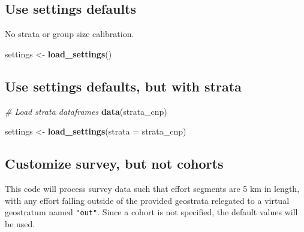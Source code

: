 \documentclass[
]{book}
\newenvironment{Shaded}{\begin{snugshade}}{\end{snugshade}}
\newcommand{\AttributeTok}[1]{\textcolor[rgb]{0.13,0.29,0.53}{#1}}
\newcommand{\CommentTok}[1]{\textcolor[rgb]{0.56,0.35,0.01}{\textit{#1}}}
\newcommand{\FunctionTok}[1]{\textcolor[rgb]{0.13,0.29,0.53}{\textbf{#1}}}
\newcommand{\NormalTok}[1]{#1}
\newcommand{\OtherTok}[1]{\textcolor[rgb]{0.56,0.35,0.01}{#1}}
\begin{document}
\hypertarget{use-settings-defaults}{%
\subsection*{Use settings defaults}\label{use-settings-defaults}}

No strata or group size calibration.

\begin{Shaded}
\begin{Highlighting}[]
\NormalTok{settings }\OtherTok{\textless{}{-}} \FunctionTok{load\_settings}\NormalTok{()}
\end{Highlighting}
\end{Shaded}

\hypertarget{use-settings-defaults-but-with-strata}{%
\subsection*{Use settings defaults, but with strata}\label{use-settings-defaults-but-with-strata}}

\begin{Shaded}
\begin{Highlighting}[]
\CommentTok{\# Load strata dataframes}
\FunctionTok{data}\NormalTok{(strata\_cnp)}

\NormalTok{settings }\OtherTok{\textless{}{-}} \FunctionTok{load\_settings}\NormalTok{(}\AttributeTok{strata =}\NormalTok{ strata\_cnp)}
\end{Highlighting}
\end{Shaded}

\hypertarget{customize-survey-but-not-cohorts}{%
\subsection*{Customize survey, but not cohorts}\label{customize-survey-but-not-cohorts}}

This code will process survey data such that effort segments are 5 km in length, with any effort falling outside of the provided geostrata relegated to a virtual geostratum named \texttt{"out"}. Since a cohort is not specified, the default values will be used.
\end{document}
